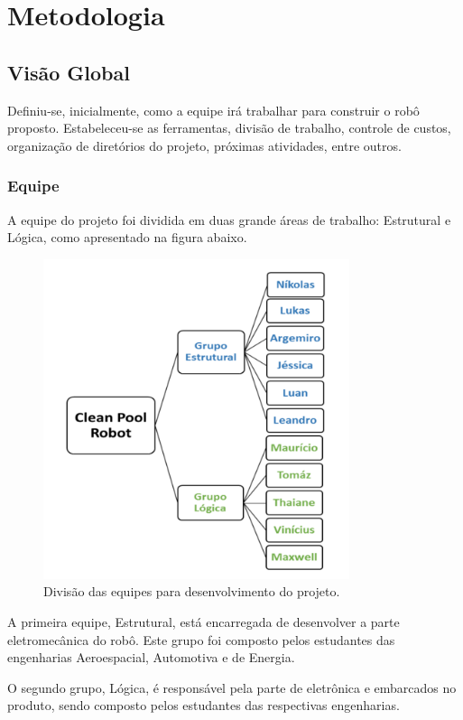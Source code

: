 \chapter{Metodologia}
\section{Visão Global}
Definiu-se, inicialmente, como a equipe irá trabalhar para construir o robô proposto. Estabeleceu-se as ferramentas, divisão de trabalho, controle de custos, organização de diretórios do projeto, próximas atividades, entre outros.

\subsection{Equipe}
A equipe do projeto foi dividida em duas grande áreas de trabalho: Estrutural e Lógica, como apresentado na figura abaixo.

\begin{figure}[h]
  \centering
  \includegraphics[width=0.8\textwidth]{figures/equipe.png}
  \caption{Divisão das equipes para desenvolvimento do projeto.}
  \label{fig:team}
\end{figure}  
\par
A primeira equipe, Estrutural, está encarregada de desenvolver a parte eletromecânica do robô. Este grupo foi composto pelos estudantes das engenharias Aeroespacial, Automotiva e de Energia. 
\par O segundo grupo, Lógica, é responsável pela parte de eletrônica e \software embarcados no produto, sendo composto pelos estudantes das respectivas engenharias.

